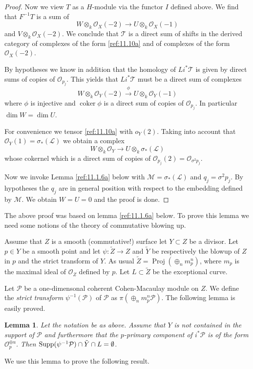 \documentclass{amsproc}
\def\Lscr{{\mathcal L}}
\def\Mscr{{\mathcal M}}
\def\Oscr{{\mathcal O}}
\def\Pscr{{\mathcal P}}
\def\Tscr{{\mathcal T}}
\def\Supp{\mathop{\text{Supp}}}
\def\coker{\operatorname {coker}}
\def\Proj{\operatorname {Proj}}
\def\r{\rightarrow}
\let\oldtext\text
\def\text#1{\oldtext{\upshape #1}}
\newtheorem{lemmas}{Lemma}[subsection]
\theoremstyle{definition}
\theoremstyle{remark}
\numberwithin{equation}{section}
\numberwithin{table}{section}
\numberwithin{figure}{section}
\def\Supp{\mathop{\text{Supp}}}
\begin{document}
\begin{proof}
Now we view $T$ as a $H$-module via the functor $I$ defined above. We
find that  $F^{-1}T$ is a sum of
\begin{equation}
\label{ref:11.10a}
W\otimes_k \Oscr_X(-2)\r U\otimes_k \Oscr_X(-1)
\end{equation}
and $V\otimes_k \Oscr_X(-2)$. We conclude that 
 $\Tscr$ is a direct sum of shifts
in the derived category of 
complexes of the form \eqref{ref:11.10a} and of complexes of the form
$\Oscr_X(-2)$. 

By hypotheses we know in addition that the homology of $Li^\ast\Tscr$
is given by direct sums of copies of $\Oscr_{p_{j}}$. This yields  that
$Li^\ast\Tscr$ must be a direct sum of complexes
\[
W\otimes_k \Oscr_Y(-2)\xrightarrow{\phi} U\otimes_k \Oscr_Y(-1)
\]
where $\phi$ is injective and $\coker \phi$ is a direct sum of copies of
$\Oscr_{p_{j}}$. In particular $\dim W=\dim U$.





For convenience we tensor \eqref{ref:11.10a} with $o_Y(2)$. 
Taking into account that
$\Oscr_Y(1)=\sigma_\ast(\Lscr)$
we obtain a
 complex
 \[
 W\otimes_k \Oscr_Y\rightarrow U\otimes_k \sigma_\ast(\Lscr)
 \]
 whose cokernel which is a direct sum of copies of
 $\Oscr_{p_{j}}(2)=\Oscr_{\sigma^{2} p_{j}}$. 

Now we invoke Lemma \ref{ref:11.1.6a} below with $\Mscr=\sigma_\ast(\Lscr)$ and
$q_{j}=\sigma^2 p_{j}$.
 By hypotheses the $q_{j}$ are in general
position with respect to the embedding defined by $\Mscr$. We obtain
$W=U=0$ and the proof is done.
\end{proof}
The above proof was based on lemma \ref{ref:11.1.6a} below. To prove this
lemma we need some notions of the theory of commutative blowing up.

Assume that $Z$ is a smooth (commutative!) surface let $Y\subset Z$ be a
 divisor. Let $p\in Y$ be a smooth point and let
$\psi:\tilde{Z}\r Z$
and $\tilde{Y}$  be respectively
the  blowup of $Z$ in $p$ and the strict transform of
$Y$. As usual $\tilde{Z}=\Proj (\oplus_n m_p^n)$, where $m_p$ is the
maximal ideal of $\Oscr_Z$ defined by $p$. Let $L\subset \tilde{Z}$ be the
exceptional curve.

Let $\Pscr$ be a one-dimensonal coherent Cohen-Macaulay module on $Z$.
We define the \emph{strict transform} $\psi^{-1}(\Pscr)$ of $\Pscr$ as
$\pi (\oplus_n m_p^n\Pscr)$. The following lemma is easily proved.
\begin{lemmas} 
\label{ref:11.1.5a}
Let the notation be as above. Assume that $Y$
  is not contained in the support of $\Pscr$ and furthermore that the
  $p$-primary component of $i^\ast \Pscr$ is of the form
  $\Oscr_p^{\oplus u}$. Then  $\Supp(\psi^{-1}\Pscr)\cap
  \tilde{Y}\cap L=\emptyset$. 
\end{lemmas}
We use this lemma to prove the following result.
\end{document}
